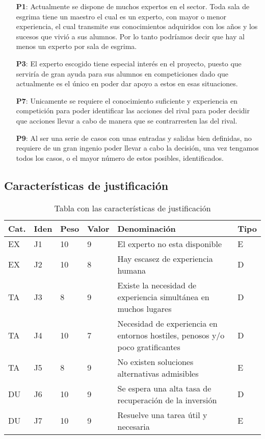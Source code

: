 \begin{enumerate}
  \item[\textbf{P1}:] Actualmente se dispone de muchos expertos en el sector. Toda sala de esgrima
     tiene un maestro el cual es un experto, con mayor o menor experiencia, el cual transmite
     sus conocimientos adquiridos con los años y los sucesos que vivió a sus alumnos. Por lo tanto
     podríamos decir que hay al menos un experto por sala de esgrima.
  \item[\textbf{P3}:] El experto escogido tiene especial interés en el proyecto, puesto que
     serviría de gran ayuda para sus alumnos en competiciones dado que actualmente es el único
     en poder dar apoyo a estos en esas situaciones.
  \item[\textbf{P7}:] Unicamente se requiere el conocimiento suficiente y experiencia en competición
     para poder identificar las acciones del rival para poder decidir que acciones llevar a cabo
     de manera que se contrarresten las del rival.
  \item[\textbf{P9}:] Al ser una serie de casos con unas entradas y salidas bien definidas, no requiere
     de un gran ingenio poder llevar a cabo la decisión, una vez tengamos todos los casos, o el mayor
     número de estos posibles, identificados.
\end{enumerate}


\subsection{Características de justificación}
\begin{table}[htb]%
  \centering
  \caption{Tabla con las características de justificación}
  \label{tab:anchura}
  \begin{tabular}{ | l | l | l | l | p{8cm} | l | }
    \hline
    Cat. & Iden & Peso & Valor & Denominación & Tipo \\ \hline
    EX & J1 & 10 & 9 & El experto no esta disponible & E \\ \hline
    EX & J2 & 10 & 8 & Hay escasez de experiencia humana & D \\ \hline
    TA & J3 & 8 & 9 & Existe la necesidad de experiencia simultánea en muchos lugares & D \\ \hline
    TA & J4 & 10 & 7 & Necesidad de experiencia en entornos hostiles, penosos y/o poco gratificantes & D \\ \hline
    TA & J5 & 8 & 9 & No existen soluciones alternativas admisibles & E \\ \hline
    DU & J6 & 10 & 9 & Se espera una alta tasa de recuperación de la inversión & D \\ \hline
    DU & J7 & 10 & 9 & Resuelve una tarea útil y necesaria & E \\ \hline
   \end{tabular}
\end{table}

